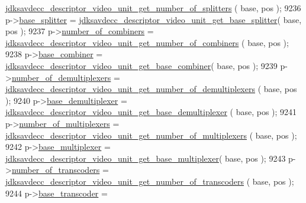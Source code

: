 \begin{DoxyCode}
      \hyperlink{group__descriptor__video_ga6b8a6a9ed716981097032b0d33f6b2c5}{jdksavdecc\_descriptor\_video\_unit\_get\_number\_of\_splitters}
      ( base, pos );
9236         p->\hyperlink{structjdksavdecc__descriptor__video__unit_a7a10a93a209406b90273d791f69a4421}{base\_splitter} = 
      \hyperlink{group__descriptor__video_gad9637961b151019b74fccf006cb55cb3}{jdksavdecc\_descriptor\_video\_unit\_get\_base\_splitter}( base,
       pos );
9237         p->\hyperlink{structjdksavdecc__descriptor__video__unit_afbc32f9432e80e58a019b1be2388cf66}{number\_of\_combiners} = 
      \hyperlink{group__descriptor__video_ga38a8c4d3fdc8c2e1cd01aedf5dc0cd25}{jdksavdecc\_descriptor\_video\_unit\_get\_number\_of\_combiners}
      ( base, pos );
9238         p->\hyperlink{structjdksavdecc__descriptor__video__unit_afeae9980c36b3e99f2e4b8ab2c31e9d5}{base\_combiner} = 
      \hyperlink{group__descriptor__video_ga36b6feea8a4a307da0c5b4706597de06}{jdksavdecc\_descriptor\_video\_unit\_get\_base\_combiner}( base,
       pos );
9239         p->\hyperlink{structjdksavdecc__descriptor__video__unit_ae2ee0d16f100be7e14722eaffcc600b4}{number\_of\_demultiplexers} = 
      \hyperlink{group__descriptor__video_gab485890893f1dc014a2e3333c6301b62}{jdksavdecc\_descriptor\_video\_unit\_get\_number\_of\_demultiplexers}
      ( base, pos );
9240         p->\hyperlink{structjdksavdecc__descriptor__video__unit_a36901b5833f03ae7be92b52745b3054c}{base\_demultiplexer} = 
      \hyperlink{group__descriptor__video_gaad93e05bd2731391e461d109a3de18a8}{jdksavdecc\_descriptor\_video\_unit\_get\_base\_demultiplexer}
      ( base, pos );
9241         p->\hyperlink{structjdksavdecc__descriptor__video__unit_aa2bffcf80dd2b162cce9a335ef515165}{number\_of\_multiplexers} = 
      \hyperlink{group__descriptor__video_ga5f6354be05c405cb65a72e257593f634}{jdksavdecc\_descriptor\_video\_unit\_get\_number\_of\_multiplexers}
      ( base, pos );
9242         p->\hyperlink{structjdksavdecc__descriptor__video__unit_a3e13f295f26afe3335587c18790c7dda}{base\_multiplexer} = 
      \hyperlink{group__descriptor__video_ga51d7d10430142d5f93784fa4e8ccba7a}{jdksavdecc\_descriptor\_video\_unit\_get\_base\_multiplexer}(
       base, pos );
9243         p->\hyperlink{structjdksavdecc__descriptor__video__unit_ad9030c572f8891febbc6108f96772835}{number\_of\_transcoders} = 
      \hyperlink{group__descriptor__video_gadad0cd864c6ac1146610c6ffd1584791}{jdksavdecc\_descriptor\_video\_unit\_get\_number\_of\_transcoders}
      ( base, pos );
9244         p->\hyperlink{structjdksavdecc__descriptor__video__unit_ac7e02a98f43dc72d6384a6635fbaf944}{base\_transcoder} = 

\end{DoxyCode}
